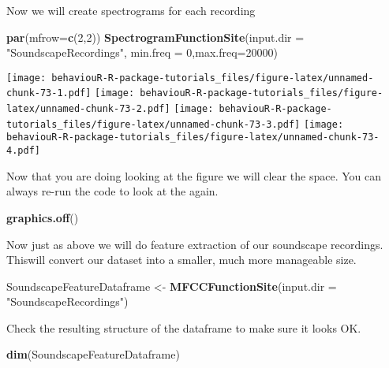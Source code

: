 \documentclass[]{book}
\newenvironment{Shaded}{\begin{snugshade}}{\end{snugshade}}
\newcommand{\DataTypeTok}[1]{\textcolor[rgb]{0.13,0.29,0.53}{#1}}
\newcommand{\DecValTok}[1]{\textcolor[rgb]{0.00,0.00,0.81}{#1}}
\newcommand{\KeywordTok}[1]{\textcolor[rgb]{0.13,0.29,0.53}{\textbf{#1}}}
\newcommand{\NormalTok}[1]{#1}
\newcommand{\StringTok}[1]{\textcolor[rgb]{0.31,0.60,0.02}{#1}}
\begin{document}
Now we will create spectrograms for each recording

\begin{Shaded}
\begin{Highlighting}[]
\KeywordTok{par}\NormalTok{(}\DataTypeTok{mfrow=}\KeywordTok{c}\NormalTok{(}\DecValTok{2}\NormalTok{,}\DecValTok{2}\NormalTok{))}
\KeywordTok{SpectrogramFunctionSite}\NormalTok{(}\DataTypeTok{input.dir =} \StringTok{"SoundscapeRecordings"}\NormalTok{,}
                    \DataTypeTok{min.freq =} \DecValTok{0}\NormalTok{,}\DataTypeTok{max.freq=}\DecValTok{20000}\NormalTok{)}
\end{Highlighting}
\end{Shaded}

\texttt{[image: behaviouR-R-package-tutorials\_files/figure-latex/unnamed-chunk-73-1.pdf]} \texttt{[image: behaviouR-R-package-tutorials\_files/figure-latex/unnamed-chunk-73-2.pdf]} \texttt{[image: behaviouR-R-package-tutorials\_files/figure-latex/unnamed-chunk-73-3.pdf]} \texttt{[image: behaviouR-R-package-tutorials\_files/figure-latex/unnamed-chunk-73-4.pdf]}

Now that you are doing looking at the figure we will clear the space. You can always re-run the code to look at the again.

\begin{Shaded}
\begin{Highlighting}[]
\KeywordTok{graphics.off}\NormalTok{()}
\end{Highlighting}
\end{Shaded}

Now just as above we will do feature extraction of our soundscape recordings. Thiswill convert our dataset into a smaller, much more manageable size.

\begin{Shaded}
\begin{Highlighting}[]
\NormalTok{SoundscapeFeatureDataframe <-}\StringTok{ }
\StringTok{  }\KeywordTok{MFCCFunctionSite}\NormalTok{(}\DataTypeTok{input.dir =} \StringTok{"SoundscapeRecordings"}\NormalTok{)}
\end{Highlighting}
\end{Shaded}

Check the resulting structure of the dataframe to make sure it looks OK.

\begin{Shaded}
\begin{Highlighting}[]
\KeywordTok{dim}\NormalTok{(SoundscapeFeatureDataframe)}
\end{Highlighting}
\end{Shaded}
\end{document}
